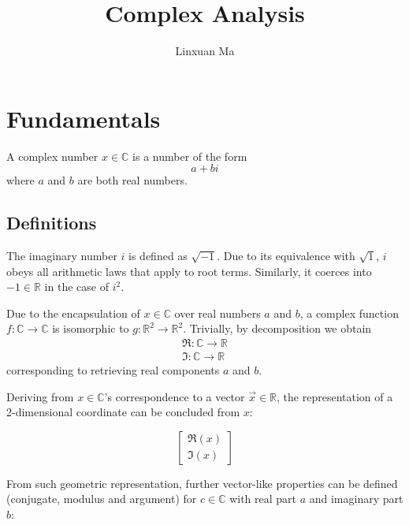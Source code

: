 \documentclass[12pt]{article}
\title{Complex Analysis}
\author{Linxuan Ma}
\begin{document}
	\maketitle
	
	
	\section{Fundamentals}
	A complex number $x \in \mathbb{C}$ is a number of the form $$a + bi$$ where $a$ and $b$ are both real numbers.
	
	\subsection{Definitions}
	The imaginary number $i$ is defined as $\sqrt{-1}$. Due to its equivalence with $\sqrt{1}$, $i$ obeys all arithmetic laws that apply to root terms. Similarly, it coerces into $-1 \in \mathbb{R}$ in the case of $i^2$.
	
	Due to the encapsulation of $x \in \mathbb{C}$ over real numbers $a$ and $b$, a complex function $f: \mathbb{C} \to \mathbb{C}$ is isomorphic to $g: \mathbb{R}^2 \to \mathbb{R}^2$. Trivially, by decomposition we obtain
	\begin{gather*}
		\Re: \mathbb{C} \to \mathbb{R} \\
		\Im: \mathbb{C} \to \mathbb{R}
	\end{gather*}
	corresponding to retrieving real components $a$ and $b$.
	
	Deriving from $x \in \mathbb{C}$'s correspondence to a vector $\vec{x} \in \mathbb{R}$, the representation of a 2-dimensional coordinate can be concluded from $x$:
	
	\begin{equation*}
		\begin{bmatrix}
			\Re(x) \\ \Im(x)
		\end{bmatrix}
	\end{equation*}
	
	From such geometric representation, further vector-like properties can be defined (conjugate, modulus and argument) for $c \in \mathbb{C}$ with real part $a$ and imaginary part $b$:
	
\end{document}
